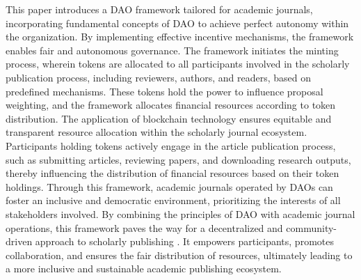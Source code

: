 \documentclass[lettersize,journal]{IEEEtran}
\begin{document}
This paper introduces a DAO framework tailored for academic journals, incorporating fundamental concepts of DAO to achieve perfect autonomy within the organization. By implementing effective incentive mechanisms, the framework enables fair and autonomous governance. The framework initiates the minting process, wherein tokens are allocated to all participants involved in the scholarly publication process, including reviewers, authors, and readers, based on predefined mechanisms. These tokens hold the power to influence proposal weighting, and the framework allocates financial resources according to token distribution.
The application of blockchain technology ensures equitable and transparent resource allocation within the scholarly journal ecosystem. Participants holding tokens actively engage in the article publication process, such as submitting articles, reviewing papers, and downloading research outputs, thereby influencing the distribution of financial resources based on their token holdings. Through this framework, academic journals operated by DAOs can foster an inclusive and democratic environment, prioritizing the interests of all stakeholders involved.
By combining the principles of DAO with academic journal operations, this framework paves the way for a decentralized and community-driven approach to scholarly publishing \cite{10426804}. It empowers participants, promotes collaboration, and ensures the fair distribution of resources, ultimately leading to a more inclusive and sustainable academic publishing ecosystem.
\end{document}
